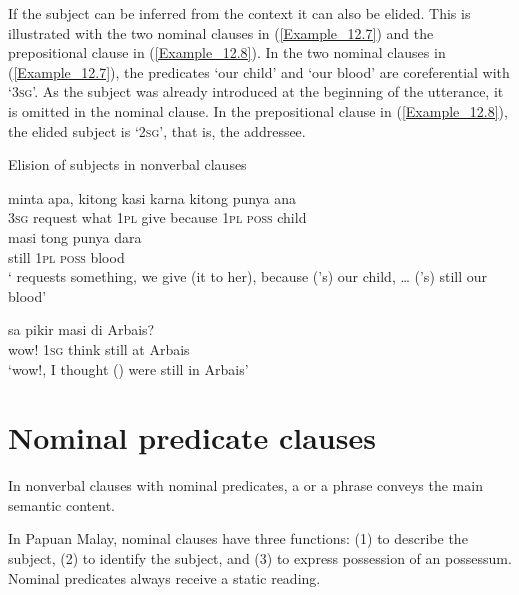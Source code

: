 If the subject can be inferred from the context it can also be elided. This is illustrated with the two nominal clauses in (\ref{Example_12.7}) and the prepositional clause in (\ref{Example_12.8}). In the two nominal clauses in (\ref{Example_12.7}), the predicates  ‘our child’ and  ‘our blood’ are coreferential with  ‘\textsc{3sg}’. As the subject was already introduced at the beginning of the utterance, it is omitted in the nominal clause. In the prepositional clause in (\ref{Example_12.8}), the elided subject is  ‘\textsc{2sg}’, that is, the addressee.


\begin{styleExampleTitle}
Elision of subjects in nonverbal clauses
\end{styleExampleTitle}

\ea
\label{Example_12.7}
 {{minta}} {{apa,}} {kitong} {kasi} {karna} {} {kitong} {punya} {ana}\\ %
 {\textsc{3sg}}  {request}  {what}  \textsc{1pl}  give  because {}  \textsc{1pl}  \textsc{poss}  child\\
\gll {\ldots}  {}  masi  {tong}  {punya}  {dara}\\
   {} {}  still  {\textsc{1pl}}  {\textsc{poss}}  {blood}\\
\glt 
‘ requests something, we give (it to her), because (’s) our child, {\ldots} (’s) still our blood’ \textstyleExampleSource{[081006-025-CvEx.0020/0022]}
\z

\ea
\label{Example_12.8}
 {sa} {pikir} {} {masi} {di} {Arbais?}\\ %
 wow!  \textsc{1sg}  think  {}  still  at  Arbais\\
 ‘wow!, I thought () were still in Arbais’ \textstyleExampleSource{[081011-011-Cv.0044]}
\z

\section{Nominal predicate clauses}
\label{Para_12.2}
In nonverbal clauses with nominal predicates, a  or a  phrase conveys the main semantic content.



In Papuan Malay, nominal clauses have three functions: (1) to describe the subject, (2) to identify the subject, and (3) to express possession of an  possessum. Nominal predicates always receive a static reading.



